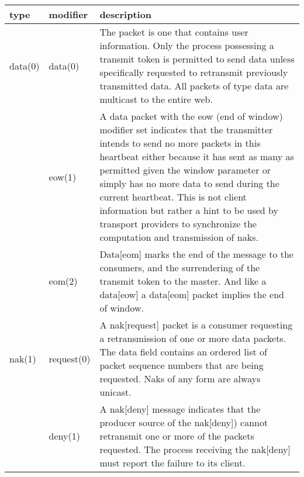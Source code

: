 \documentclass[11pt]{article}
\begin{document}
\begin{center}
\renewcommand{\arraystretch}{1.5}
\begin{longtable}{llp{}}
   type & modifier & description \\ \hline

   data(0)  & data(0)    & The packet is one that contains user
                           information. Only the process possessing a
                           transmit token is permitted to send data
                           unless specifically requested to retransmit
                           previously transmitted data. All packets of
                           type data are multicast to the entire web. \\

            & eow(1)     & A data packet with the eow (end of window)
                           modifier set indicates that the transmitter
                           intends to send no more packets in this
                           heartbeat either because it has sent as many
                           as permitted given the window parameter or
                           simply has no more data to send during the
                           current heartbeat. This is not client
                           information but rather a hint to be used by
                           transport providers to synchronize the
                           computation and transmission of naks. \\

            & eom(2)     & Data[eom] marks the end of the message to the
                           consumers, and the surrendering of the
                           transmit token to the master. And like a
                           data[eow] a data[eom] packet implies the end
                           of window. \\
   nak(1)   & request(0) & A nak[request] packet is a consumer
                           requesting a retransmission of one or more
                           data packets. The data field contains an
                           ordered list of packet sequence numbers that
                           are being requested. Naks of any form are
                           always unicast. \\

            & deny(1)    & A nak[deny] message indicates that the
                           producer source of the nak[deny]) cannot
                           retransmit one or more of the packets
                           requested. The process receiving the
                           nak[deny] must report the failure to its
                           client. \\


\end{longtable}
\end{center}
\end{document}

